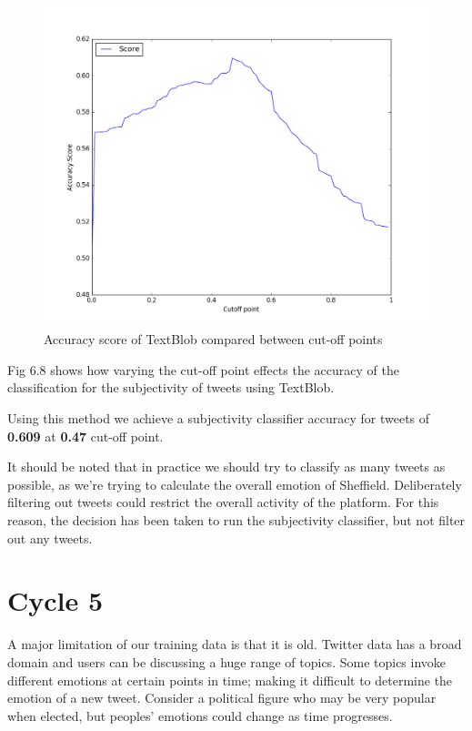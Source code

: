 \begin{figure}[H]
\center
\includegraphics[width=13cm]{figures/subjectiveTest.png}
\caption{Accuracy score of TextBlob\cite{textblob} compared between cut-off points}
\end{figure}

Fig 6.8 shows how varying the cut-off point effects the accuracy of the classification for the subjectivity of tweets using TextBlob\cite{textblob}. 

Using this method we achieve a subjectivity classifier accuracy for tweets of \textbf{0.609} at \textbf{0.47} cut-off point.

It should be noted that in practice we should try to classify as many tweets as possible, as we're trying to calculate the overall emotion of Sheffield. Deliberately filtering out tweets could restrict the overall activity of the platform. For this reason, the decision has been taken to run the subjectivity classifier, but not filter out any tweets.

\section{Cycle 5} \label{c5}

A major limitation of our training data is that it is old. Twitter data has a broad domain and users can be discussing a huge range of topics. Some topics invoke different emotions at certain points in time; making it difficult to determine the emotion of a new tweet. Consider a political figure who may be very popular when elected, but peoples' emotions could change as time progresses.

